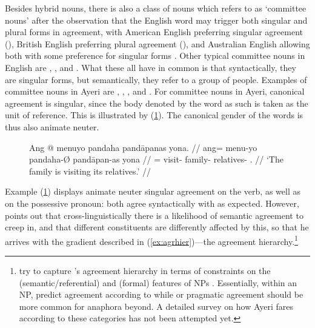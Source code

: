 

Besides hybrid nouns, there is also a class of nouns which \citet{corbett2006}
refers to as `committee nouns' after the observation that the English word 
 may trigger both singular and plural forms in agreement, with
American English preferring singular agreement (), British English preferring plural agreement (), and Australian English allowing both with some
preference for singular forms \citep[212--213]{corbett2006}. Other typical
committee nouns in English are , , and .
What these all have in common is that syntactically, they are singular forms,
but semantically, they refer to a group of people. Examples of committee nouns
in Ayeri are , ,
, and .
For committee nouns in Ayeri, canonical agreement is singular, since the body
denoted by the word as such is taken as the unit of reference. This is
illustrated by (\ref{ex:ayrcommitteenoun}). The canonical gender of the words
is thus also animate neuter.

\begin{figure}
\ex\label{ex:ayrcommitteenoun}\begingl
	\gla Ang @ menuyo pandaha pandāpanas yona. //
	\glb ang= menu-yo pandaha-Ø pandāpan-as yona //
	\glc \AgtT{}= visit-\TsgN{} family-\Top{} relatives-\Parg{} 
		\TsgN{}.\Gen{} //
	\glft `The family is visiting its relatives.' //
\endgl\xe
\end{figure}

Example (\ref{ex:ayrcommitteenoun}) displays animate neuter singular agreement
on the verb, as well as on the possessive pronoun: both agree syntactically with
 as expected. However, \citet{corbett2006} points
out that cross-linguistically there is a likelihood of semantic agreement to
creep in, and that different constituents are differently affected by this, so
that he arrives with the gradient described in (\ref{ex:agrhier})---the
agreement hierarchy.\footnote{\citet{wechslerzlatic2003} try to
capture \citeauthor{corbett2006}'s agreement hierarchy in terms of constraints
on the \Index{} (semantic/referential) and \Concord{} (formal) features of
NPs \parencites[83--94]{wechslerzlatic2003}[186--192]{bresnan2016}. Essentially,
within an NP, \citet{wechslerzlatic2003} predict agreement according to
\Concord{} while \Index{} or pragmatic agreement should be more common for
anaphora beyond. A detailed survey on how Ayeri fares according to these
categories has not been attempted yet.}

